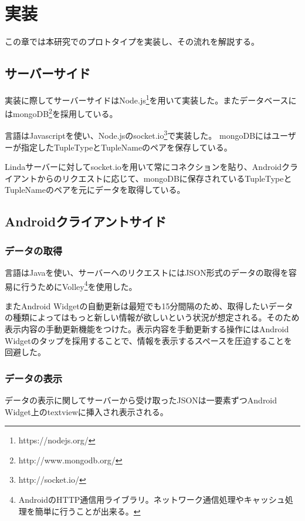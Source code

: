 \chapter{実装}
\label{chap:prototype}

この章では本研究でのプロトタイプを実装し、その流れを解説する。

\section{サーバーサイド}
実装に際してサーバーサイドはNode.js\footnote{https://nodejs.org/}を用いて実装した。またデータベースにはmongoDB\footnote{http://www.mongodb.org/}を採用している。

言語はJavascriptを使い、Node.jsのsocket.io\footnote{http://socket.io/}で実装した。
mongoDBにはユーザーが指定したTupleTypeとTupleNameのペアを保存している。

Lindaサーバーに対してsocket.ioを用いて常にコネクションを貼り、Androidクライアントからのリクエストに応じて、mongoDBに保存されているTupleTypeとTupleNameのペアを元にデータを取得している。

\section{Androidクライアントサイド}
\subsection{データの取得}
言語はJavaを使い、サーバーへのリクエストにはJSON形式のデータの取得を容易に行うためにVolley\footnote{AndroidのHTTP通信用ライブラリ。ネットワーク通信処理やキャッシュ処理を簡単に行うことが出来る。}を使用した。

またAndroid Widgetの自動更新は最短でも15分間隔のため、取得したいデータの種類によってはもっと新しい情報が欲しいという状況が想定される。そのため表示内容の手動更新機能をつけた。表示内容を手動更新する操作にはAndroid Widgetのタップを採用することで、情報を表示するスペースを圧迫することを回避した。

\subsection{データの表示}
データの表示に関してサーバーから受け取ったJSONは一要素ずつAndroid Widget上のtextviewに挿入され表示される。
